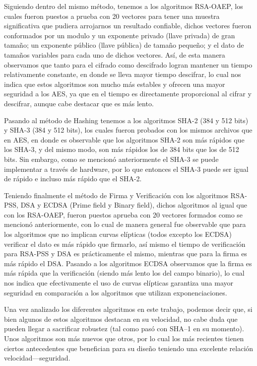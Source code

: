 \documentclass[onecolumn]{IEEEtran}
\begin{document}
Siguiendo dentro del mismo método, tenemos a los algoritmos RSA-OAEP, los cuales fueron puestos a prueba con 20 vectores para tener una muestra significativa que pudiera arrojarnos un resultado confiable, dichos vectores fueron conformados por un modulo y un exponente privado (llave privada) de gran tamaño; un exponente público (llave pública) de tamaño pequeño; y el dato de tamaños variables para cada uno de dichos vectores. Así, de esta manera observamos que tanto para el cifrado como descifrado logran mantener un tiempo relativamente constante, en donde se lleva mayor tiempo descifrar, lo cual nos indica que estos algoritmos son mucho más estables y ofrecen una mayor seguridad a los AES, ya que en el tiempo es directamente proporcional al cifrar y descifrar, aunque cabe destacar que es más lento.

Pasando al método de Hashing tenemos a los algoritmos SHA-2 (384 y 512 bits) y SHA-3 (384 y 512 bits), los cuales fueron probados con los mismos archivos que en AES, en donde es observable que los algoritmos SHA-2 son más rápidos que los SHA-3, y del mismo modo, son más rápidos los de 384 bits que los de 512 bits. Sin embargo, como se mencionó anteriormente el SHA-3 se puede implementar a través de hardware, por lo que entonces el SHA-3 puede ser igual de rápido e incluso más rápido que el SHA-2.

Teniendo finalmente el método de Firma y Verificación con los algoritmos RSA-PSS, DSA y ECDSA (Prime field y Binary field), dichos algoritmos al igual que con los RSA-OAEP, fueron puestos aprueba con 20 vectores formados como se mencionó anteriormente, con lo cual de manera general fue observable que para los algoritmos que no implican curvas elípticas (todos excepto los ECDSA) verificar el dato es más rápido que firmarlo, así mismo el tiempo de verificación para RSA-PSS y DSA es prácticamente el mismo, mientras que para la firma es más rápido el DSA. Pasando a los algoritmos ECDSA observamos que la firma es más rápida que la verificación (siendo más lento los del campo binario), lo cual nos indica que efectivamente el uso de curvas elípticas garantiza una mayor seguridad en comparación a los algoritmos que utilizan exponenciaciones.

Una vez analizado los diferentes algoritmos en este trabajo, podemos decir que, si bien algunos de estos algoritmos destacan en su velocidad, no cabe duda que pueden llegar a sacrificar robustez (tal como pasó con SHA–1 en su momento). Unos algoritmos son más nuevos que otros, por lo cual los más recientes tienen ciertos antecedentes que benefician para su diseño teniendo una excelente relación velocidad—seguridad.
\end{document}
